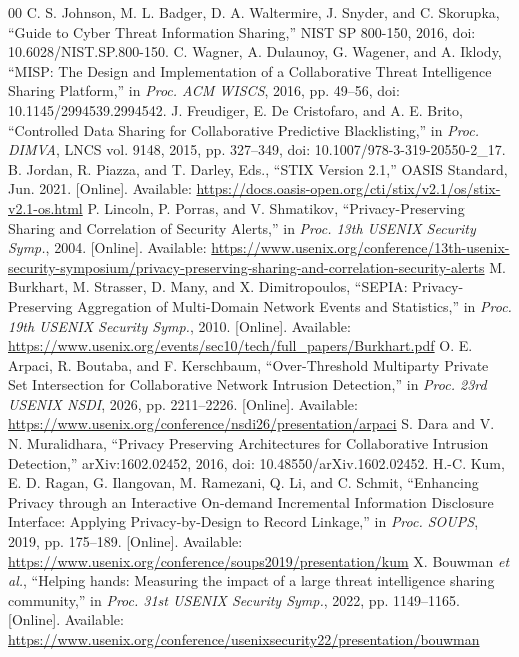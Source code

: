 \documentclass[conference,letterpaper]{IEEEtran}
\begin{document}
\begin{thebibliography}{00}
 C. S. Johnson, M. L. Badger, D. A. Waltermire, J. Snyder, and C. Skorupka, ``Guide to Cyber Threat Information Sharing,'' NIST SP 800-150, 2016, doi: 10.6028/NIST.SP.800-150.
 C. Wagner, A. Dulaunoy, G. Wagener, and A. Iklody, ``MISP: The Design and Implementation of a Collaborative Threat Intelligence Sharing Platform,'' in \emph{Proc. ACM WISCS}, 2016, pp. 49--56, doi: 10.1145/2994539.2994542.
 J. Freudiger, E. De Cristofaro, and A. E. Brito, ``Controlled Data Sharing for Collaborative Predictive Blacklisting,'' in \emph{Proc. DIMVA}, LNCS vol. 9148, 2015, pp. 327--349, doi: 10.1007/978-3-319-20550-2\_17.
 B. Jordan, R. Piazza, and T. Darley, Eds., ``STIX Version 2.1,'' OASIS Standard, Jun. 2021. [Online]. Available: \url{https://docs.oasis-open.org/cti/stix/v2.1/os/stix-v2.1-os.html}
 P. Lincoln, P. Porras, and V. Shmatikov, ``Privacy-Preserving Sharing and Correlation of Security Alerts,'' in \emph{Proc. 13th USENIX Security Symp.}, 2004. [Online]. Available: \url{https://www.usenix.org/conference/13th-usenix-security-symposium/privacy-preserving-sharing-and-correlation-security-alerts}
 M. Burkhart, M. Strasser, D. Many, and X. Dimitropoulos, ``SEPIA: Privacy-Preserving Aggregation of Multi-Domain Network Events and Statistics,'' in \emph{Proc. 19th USENIX Security Symp.}, 2010. [Online]. Available: \url{https://www.usenix.org/events/sec10/tech/full_papers/Burkhart.pdf}
 O. E. Arpaci, R. Boutaba, and F. Kerschbaum, ``Over-Threshold Multiparty Private Set Intersection for Collaborative Network Intrusion Detection,'' in \emph{Proc. 23rd USENIX NSDI}, 2026, pp. 2211--2226. [Online]. Available: \url{https://www.usenix.org/conference/nsdi26/presentation/arpaci}
 S. Dara and V. N. Muralidhara, ``Privacy Preserving Architectures for Collaborative Intrusion Detection,'' arXiv:1602.02452, 2016, doi: 10.48550/arXiv.1602.02452.
 H.-C. Kum, E. D. Ragan, G. Ilangovan, M. Ramezani, Q. Li, and C. Schmit, ``Enhancing Privacy through an Interactive On-demand Incremental Information Disclosure Interface: Applying Privacy-by-Design to Record Linkage,'' in \emph{Proc. SOUPS}, 2019, pp. 175--189. [Online]. Available: \url{https://www.usenix.org/conference/soups2019/presentation/kum}
 X. Bouwman \emph{et al.}, ``Helping hands: Measuring the impact of a large threat intelligence sharing community,'' in \emph{Proc. 31st USENIX Security Symp.}, 2022, pp. 1149--1165. [Online]. Available: \url{https://www.usenix.org/conference/usenixsecurity22/presentation/bouwman}

\end{thebibliography}
\end{document}
